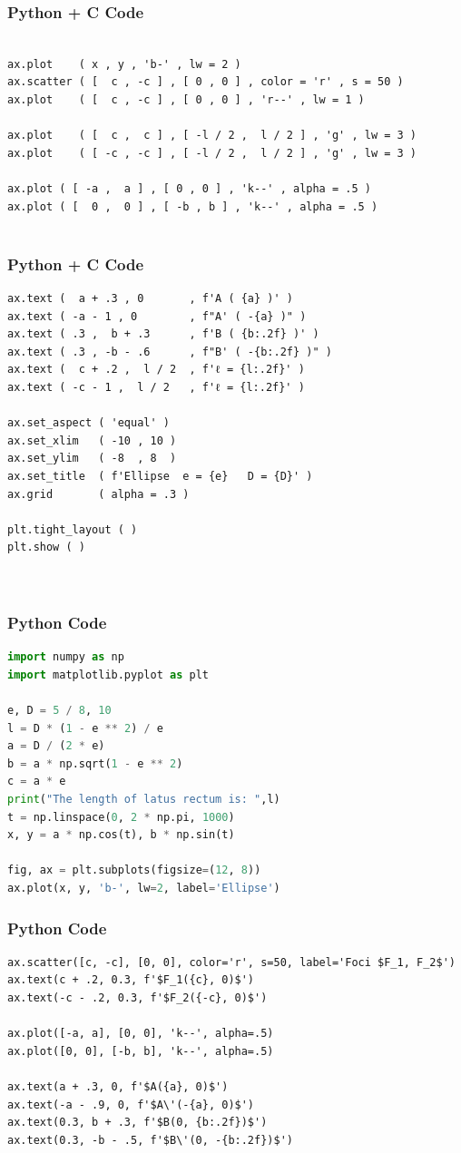 \documentclass{beamer}
\numberwithin{equation}{section}
\begin{document}
\begin{frame}[fragile]
    \frametitle{Python + C Code }
    \begin{lstlisting}

ax.plot    ( x , y , 'b-' , lw = 2 )
ax.scatter ( [  c , -c ] , [ 0 , 0 ] , color = 'r' , s = 50 )
ax.plot    ( [  c , -c ] , [ 0 , 0 ] , 'r--' , lw = 1 )

ax.plot    ( [  c ,  c ] , [ -l / 2 ,  l / 2 ] , 'g' , lw = 3 )
ax.plot    ( [ -c , -c ] , [ -l / 2 ,  l / 2 ] , 'g' , lw = 3 )

ax.plot ( [ -a ,  a ] , [ 0 , 0 ] , 'k--' , alpha = .5 )
ax.plot ( [  0 ,  0 ] , [ -b , b ] , 'k--' , alpha = .5 )


\end{lstlisting}
\end{frame}
\begin{frame}[fragile]
    \frametitle{Python + C Code }
    \begin{lstlisting}
ax.text (  a + .3 , 0       , f'A ( {a} )' )
ax.text ( -a - 1 , 0        , f"A' ( -{a} )" )
ax.text ( .3 ,  b + .3      , f'B ( {b:.2f} )' )
ax.text ( .3 , -b - .6      , f"B' ( -{b:.2f} )" )
ax.text (  c + .2 ,  l / 2  , f'ℓ = {l:.2f}' )
ax.text ( -c - 1 ,  l / 2   , f'ℓ = {l:.2f}' )

ax.set_aspect ( 'equal' )
ax.set_xlim   ( -10 , 10 )
ax.set_ylim   ( -8  , 8  )
ax.set_title  ( f'Ellipse  e = {e}   D = {D}' )
ax.grid       ( alpha = .3 )

plt.tight_layout ( )
plt.show ( )



\end{lstlisting}
\end{frame}

\begin{frame}[fragile]
\frametitle{Python Code }
\begin{lstlisting}[language=Python]
import numpy as np
import matplotlib.pyplot as plt

e, D = 5 / 8, 10
l = D * (1 - e ** 2) / e
a = D / (2 * e)
b = a * np.sqrt(1 - e ** 2)
c = a * e
print("The length of latus rectum is: ",l)
t = np.linspace(0, 2 * np.pi, 1000)
x, y = a * np.cos(t), b * np.sin(t)

fig, ax = plt.subplots(figsize=(12, 8))
ax.plot(x, y, 'b-', lw=2, label='Ellipse')

\end{lstlisting}

\end{frame}
\begin{frame}[fragile]
    \frametitle{Python Code}
    \begin{lstlisting}
ax.scatter([c, -c], [0, 0], color='r', s=50, label='Foci $F_1, F_2$')
ax.text(c + .2, 0.3, f'$F_1({c}, 0)$')
ax.text(-c - .2, 0.3, f'$F_2({-c}, 0)$')

ax.plot([-a, a], [0, 0], 'k--', alpha=.5)
ax.plot([0, 0], [-b, b], 'k--', alpha=.5)

ax.text(a + .3, 0, f'$A({a}, 0)$')
ax.text(-a - .9, 0, f'$A\'(-{a}, 0)$')
ax.text(0.3, b + .3, f'$B(0, {b:.2f})$')
ax.text(0.3, -b - .5, f'$B\'(0, -{b:.2f})$')

\end{lstlisting}
\end{frame}
\end{document}
